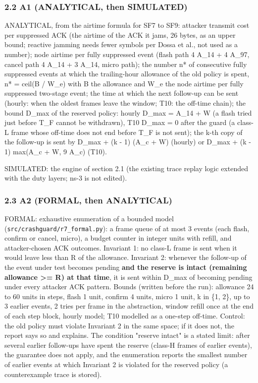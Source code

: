 \subsubsection*{2.2 A1 (ANALYTICAL, then SIMULATED)}

ANALYTICAL, from the airtime formula for SF7 to SF9: attacker transmit cost per suppressed ACK (the airtime of the ACK it jams, 26 bytes, as an upper bound; reactive jamming needs fewer symbols per Dossa et al., not used as a number); node airtime per fully suppressed event (flash path 4 A\_14 + 4 A\_97, cancel path 4 A\_14 + 3 A\_14, micro path); the number n* of consecutive fully suppressed events at which the trailing-hour allowance of the old policy is spent, n* = ceil(B / W\_e) with B the allowance and W\_e the node airtime per fully suppressed two-stage event; the time at which the next follow-up can be sent (hourly: when the oldest frames leave the window; T10: the off-time chain); the bound D\_max of the reserved policy: hourly D\_max = A\_14 + W (a flash tried just before T\_F cannot be withdrawn), T10 D\_max = 0 after the guard (a class-L frame whose off-time does not end before T\_F is not sent); the k-th copy of the follow-up is sent by D\_max + (k - 1) (A\_c + W) (hourly) or D\_max + (k - 1) max(A\_c + W, 9 A\_c) (T10).

SIMULATED: the engine of section 2.1 (the existing trace replay logic extended with the duty layers; ns-3 is not edited).

\subsubsection*{2.3 A2 (FORMAL, then ANALYTICAL)}

FORMAL: exhaustive enumeration of a bounded model (\texttt{src/crashguard/r7\_formal.py}): a frame queue of at most 3 events (each flash, confirm or cancel, micro), a budget counter in integer units with refill, and attacker-chosen ACK outcomes. Invariant 1: no class-L frame is sent when it would leave less than R of the allowance. Invariant 2: whenever the follow-up of the event under test becomes pending \textbf{and the reserve is intact (remaining allowance >= R) at that time}, it is sent within D\_max of becoming pending under every attacker ACK pattern. Bounds (written before the run): allowance 24 to 60 units in steps, flash 1 unit, confirm 4 units, micro 1 unit, k in \{1, 2\}, up to 3 earlier events, 2 tries per frame in the abstraction, window refill once at the end of each step block, hourly model; T10 modelled as a one-step off-time. Control: the old policy must violate Invariant 2 in the same space; if it does not, the report says so and explains. The condition "reserve intact" is a stated limit: after several earlier follow-ups have spent the reserve (class-H frames of earlier events), the guarantee does not apply, and the enumeration reports the smallest number of earlier events at which Invariant 2 is violated for the reserved policy (a counterexample trace is stored).

